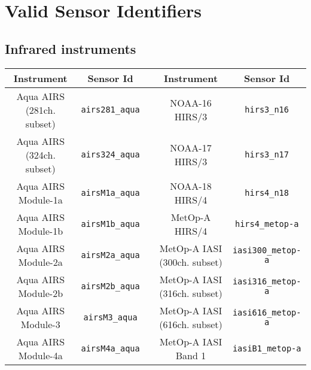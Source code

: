 \chapter{Valid Sensor Identifiers}

\clearpage
\section{Infrared instruments}
\label{sec:infrared_instruments_sensor_id}

\begin{table}[htp]
  \centering
  \begin{tabular}{c c c c c}
    \hline
    \sffamily\textbf{Instrument} & \sffamily\textbf{Sensor Id} & \hspace{0.2cm} & \sffamily\textbf{Instrument} & \sffamily\textbf{Sensor Id} \\
    \hline\hline
Aqua AIRS (281ch. subset) & \texttt{airs281\_aqua} & \hspace{0.2cm} & NOAA-16 HIRS/3 & \texttt{hirs3\_n16}                      \\
Aqua AIRS (324ch. subset) & \texttt{airs324\_aqua} & \hspace{0.2cm} & NOAA-17 HIRS/3 & \texttt{hirs3\_n17}                      \\
Aqua AIRS Module-1a & \texttt{airsM1a\_aqua}       & \hspace{0.2cm} & NOAA-18 HIRS/4 & \texttt{hirs4\_n18}                      \\
Aqua AIRS Module-1b & \texttt{airsM1b\_aqua}       & \hspace{0.2cm} & MetOp-A HIRS/4 & \texttt{hirs4\_metop-a}                  \\
Aqua AIRS Module-2a & \texttt{airsM2a\_aqua}       & \hspace{0.2cm} & MetOp-A IASI (300ch. subset) & \texttt{iasi300\_metop-a}  \\
Aqua AIRS Module-2b & \texttt{airsM2b\_aqua}       & \hspace{0.2cm} & MetOp-A IASI (316ch. subset)  & \texttt{iasi316\_metop-a} \\
Aqua AIRS Module-3  & \texttt{airsM3\_aqua}        & \hspace{0.2cm} & MetOp-A IASI (616ch. subset)  & \texttt{iasi616\_metop-a} \\
Aqua AIRS Module-4a & \texttt{airsM4a\_aqua}       & \hspace{0.2cm} & MetOp-A IASI Band 1 & \texttt{iasiB1\_metop-a}            \\

\end{tabular}
\end{table}
